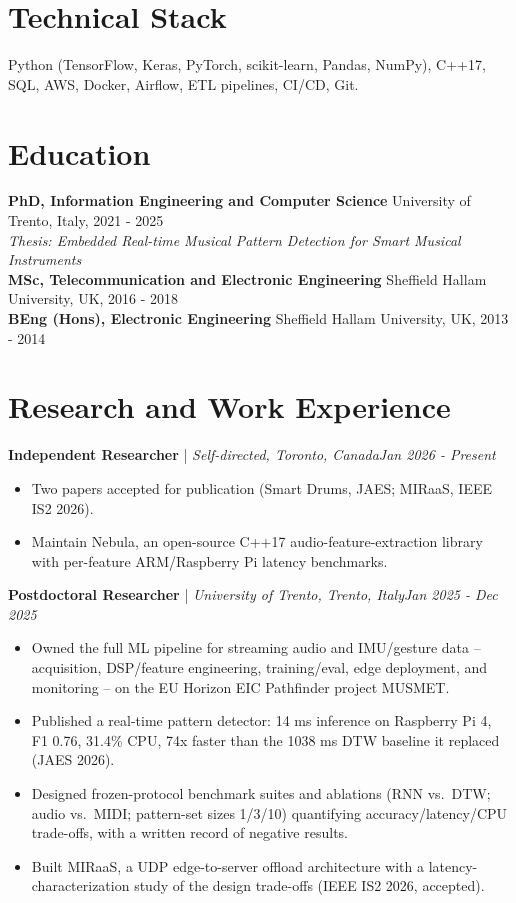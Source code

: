\documentclass[11pt]{article}
\newenvironment{cvrole}[5]{%
  \par\noindent\textbf{\large #1} | \textit{\small #2, #3}\hfill \textit{\small #4 - #5}\par
  \begin{itemize}[leftmargin=2em, itemsep=-0.3em, topsep=-0.5em]%
}{%
  \end{itemize}\par\noindent\mbox{}\par\vspace{0.1em}%
}
\begin{document}
\section*{Technical Stack}
Python (TensorFlow, Keras, PyTorch, scikit-learn, Pandas, NumPy), C++17, SQL, AWS, Docker, Airflow, ETL pipelines, CI/CD, Git.

\section*{Education}
\noindent\textbf{PhD, Information Engineering and Computer Science} \hfill University of Trento, Italy, 2021 - 2025\\
\textit{Thesis: Embedded Real-time Musical Pattern Detection for Smart Musical Instruments}\\[4pt]
\noindent\textbf{MSc, Telecommunication and Electronic Engineering} \hfill Sheffield Hallam University, UK, 2016 - 2018\\[4pt]
\noindent\textbf{BEng (Hons), Electronic Engineering} \hfill Sheffield Hallam University, UK, 2013 - 2014

\section*{Research and Work Experience}

\begin{cvrole}{Independent Researcher}{Self-directed}{Toronto, Canada}{Jan 2026}{Present}
  \item Two papers accepted for publication (Smart Drums, JAES; MIRaaS, IEEE IS2 2026).
  \item Maintain Nebula, an open-source C++17 audio-feature-extraction library with per-feature ARM/Raspberry Pi latency benchmarks.
\end{cvrole}

\begin{cvrole}{Postdoctoral Researcher}{University of Trento}{Trento, Italy}{Jan 2025}{Dec 2025}
  \item Owned the full ML pipeline for streaming audio and IMU/gesture data -- acquisition, DSP/feature engineering, training/eval, edge deployment, and monitoring -- on the EU Horizon EIC Pathfinder project MUSMET.
  \item Published a real-time pattern detector: 14 ms inference on Raspberry Pi 4, F1 0.76, 31.4\% CPU, 74x faster than the 1038 ms DTW baseline it replaced (JAES 2026).
  \item Designed frozen-protocol benchmark suites and ablations (RNN vs.\ DTW; audio vs.\ MIDI; pattern-set sizes 1/3/10) quantifying accuracy/latency/CPU trade-offs, with a written record of negative results.
  \item Built MIRaaS, a UDP edge-to-server offload architecture with a latency-characterization study of the design trade-offs (IEEE IS2 2026, accepted).
\end{cvrole}
\end{document}
